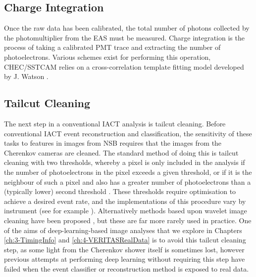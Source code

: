 \subsection{Charge Integration}

Once the raw data has been calibrated, the total number of photons collected by the photomultiplier from the EAS must be measured. Charge integration is the process of taking a calibrated PMT trace and extracting the number of photoelectrons. Various schemes exist for performing this operation, CHEC/SSTCAM relies on a cross-correlation template fitting model developed by J. Watson \cite{jasonthesis}.

\subsection{Tailcut Cleaning}

The next step in a conventional IACT analysis is tailcut cleaning. Before conventional IACT event reconstruction and classification, the sensitivity of these tasks to features in images from NSB requires that the images from the Cherenkov cameras are cleaned. The standard method of doing this is tailcut cleaning with two thresholds, whereby a pixel is only included in the analysis if the number of photoelectrons in the pixel exceeds a given threshold, or if it is the neighbour of such a pixel and also has a greater number of photoelectrons than a (typically lower) second threshold \cite{hegratailcut}. These thresholds require optimisation to achieve a desired event rate, and the implementations of this procedure vary by instrument (see for example \cite{magictailcut}\cite{Benbow}\cite{magictime}). Alternatively methods based upon wavelet image cleaning have been proposed \cite{wavelet}, but these are far more rarely used in practice. One of the aims of deep-learning-based image analyses that we explore in Chapters \ref{ch:3-TimingInfo} and \ref{ch:4-VERITASRealData} is to avoid this tailcut cleaning step, as some light from the Cherenkov shower itself is sometimes lost, however previous attempts at performing deep learning without requiring this step have failed when the event classifier or reconstruction method is exposed to real data. 

